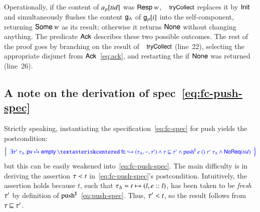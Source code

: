 %
Operationally, if the content of $\text{\emph{a}}_p[\mathit{tid}]$ was $\mathsf{Resp}\ {w}$,
$\aact{tryCollect}$ replaces it by $\mathsf{Init}$ and simultaneously flushes
the content $\mathsf{g}_{\Delta}$ of $\mathsf{g}_{p}[i]$ into the self-component, returning
$\mathsf{Some}\ {w}$ as its result; otherwise it returns $\mathsf{None}$ without
changing anything. The predicate $\mathsf{Ack}$ describes these two possible
outcomes.
%
The rest of the proof goes by branching on the result of
$\aact{tryCollect}$ (line~22), selecting the appropriate disjunct from
$\mathsf{Ack}$~\eqref{eq:ack}, and restarting the  if $\mathsf{None}$ was
returned (line~26).

\subsection{A note on the derivation of spec~\eqref{eq:fc-push-spec}}

Strictly speaking, instantiating the specification~\eqref{eq:fc-spec}
for push yields the postcondition:
%
\[{\small
\spec{
\begin{array}{c}
  \exists \hist'~\histd\ldot \hpriv \spts \hempty ~\sep~
  \histso{\hfc}{\histd, -, \hist'} \aand
  \hist \pre \hist' \aand
  \fspec{\push}~e~()~\hist'~\histd
  \aand \noreqs{\tid}
\end{array}
}
}\]
%
but this can be easily weakened into~\eqref{eq:fc-push-spec}. The main
difficulty is in deriving the assertion $\tau < t$
in~\eqref{eq:fc-push-spec}'s postcondition. Intuitively, the assertion
holds because $t$, such that $\tau_{\Delta} = t \mapsto (l, e::l)$, has been
taken to be \emph{fresh} \wrt $\tau'$ by definition of
${\text{push}}^{\sharp}$~\eqref{eq:push-spec}. Thus, $\tau' < t$, so the
result follows from $\tau \sqsubseteq \tau'$.

